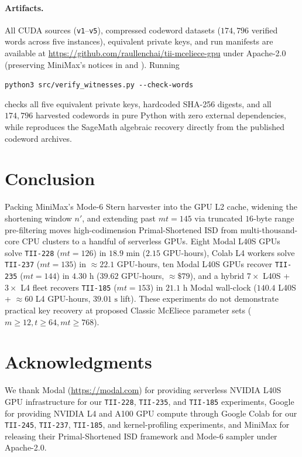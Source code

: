 \documentclass[11pt,a4paper]{article}
\begin{document}
\paragraph{Artifacts.}
All CUDA sources (\texttt{v1}--\texttt{v5}), compressed codeword datasets ($174{,}796$ verified words across five instances), equivalent private keys, and run manifests are available at \url{https://github.com/raullenchai/tii-mceliece-gpu} under Apache-2.0 (preserving MiniMax's notices in  and ). Running
\begin{center}
\texttt{python3 src/verify\_witnesses.py -{}-check-words}
\end{center}
checks all five equivalent private keys, hardcoded SHA-256 digests, and all $174{,}796$ harvested codewords in pure Python with zero external dependencies, while  reproduces the SageMath algebraic recovery directly from the published codeword archives.

\section{Conclusion}

Packing MiniMax's Mode-6 Stern harvester into the GPU L2 cache, widening the shortening window $n'$, and extending past $mt=145$ via truncated $16$-byte range pre-filtering moves high-codimension Primal-Shortened ISD from multi-thousand-core CPU clusters to a handful of serverless GPUs. Eight Modal L40S GPUs solve \texttt{TII-228} ($mt=126$) in $18.9\text{ min}$ ($2.15$ GPU-hours), Colab L4 workers solve \texttt{TII-237} ($mt=135$) in $\approx 22.1$ GPU-hours, ten Modal L40S GPUs recover \texttt{TII-235} ($mt=144$) in $4.30\text{ h}$ ($39.62$ GPU-hours, $\approx\$79$), and a hybrid $7\times$ L40S + $3\times$ L4 fleet recovers \texttt{TII-185} ($mt=153$) in $21.1\text{ h}$ Modal wall-clock ($140.4$ L40S + $\approx 60$ L4 GPU-hours, $39.01\text{ s}$ lift). These experiments do not demonstrate practical key recovery at proposed Classic McEliece parameter sets ($m \ge 12, t \ge 64, mt \ge 768$).

\section*{Acknowledgments}
We thank Modal (\url{https://modal.com}) for providing serverless NVIDIA L40S GPU infrastructure for our \texttt{TII-228}, \texttt{TII-235}, and \texttt{TII-185} experiments, Google for providing NVIDIA L4 and A100 GPU compute through Google Colab for our \texttt{TII-245}, \texttt{TII-237}, \texttt{TII-185}, and kernel-profiling experiments, and MiniMax for releasing their Primal-Shortened ISD framework and Mode-6 sampler under Apache-2.0.
\end{document}
